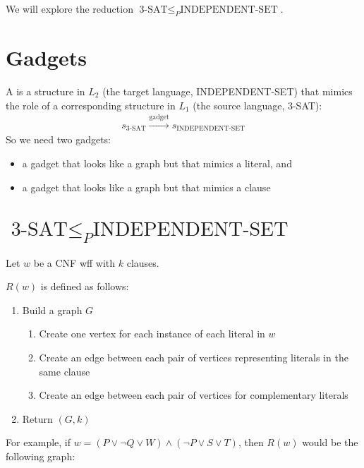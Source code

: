 \documentclass[a4paper]{report}
\newcommand{\bookref}[3]{\marginpar{\faBook{}~#1\\Chapter #2\\Section #3}}
\theoremstyle{definition}
\begin{document}
We will explore the reduction $\text{3-SAT} \leq_P \text{INDEPENDENT-SET}$.

\section{Gadgets}

A  is a structure in $L_2$ (the target language, INDEPENDENT-SET) that mimics the role of a corresponding structure in $L_1$ (the source language, 3-SAT):
\begin{align*}
s_{\text{3-SAT}} \xrightarrow{\text{gadget}} s_{\text{INDEPENDENT-SET}}
\end{align*}
%
So we need two gadgets:
\begin{itemize}
\item a gadget that looks like a graph but that mimics a literal, and
\item a gadget that looks like a graph but that mimics a clause
\end{itemize}

\section{$\text{3-SAT} \leq_P \text{INDEPENDENT-SET}$}
\bookref{ER}{28}{28.4}
Let $w$ be a CNF wff with $k$ clauses.

$R(w)$ is defined as follows:
\begin{enumerate}
\item Build a graph $G$
\begin{enumerate}
\item Create one vertex for each instance of each literal in $w$
\item Create an edge between each pair of vertices representing literals in the same clause
\item Create an edge between each pair of vertices for complementary literals
\end{enumerate}
\item Return $(G, k)$
\end{enumerate}

For example, if $w = (P \vee \neg Q \vee W) \wedge (\neg P \vee S \vee T)$, then $R(w)$ would be the following graph:
\begin{center}
% 

\end{center}
\end{document}
